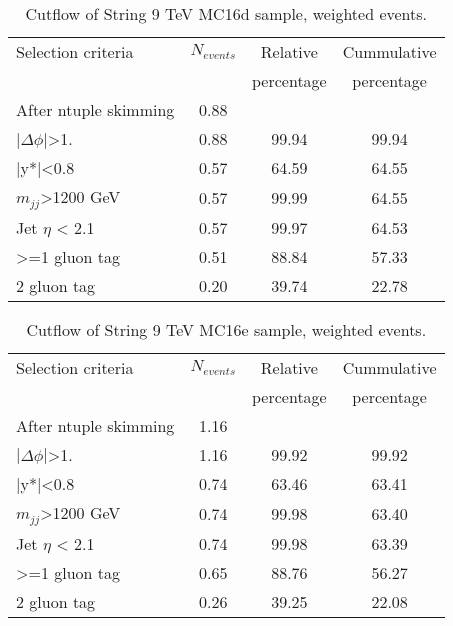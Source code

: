 \begin{table}[ht]
\begin{center}
\begin{tabular}{|l|c|c|c|}
\hline
Selection criteria & $N_{events}$ & Relative & Cummulative \\
 & & percentage & percentage \\
\hline
After ntuple skimming & 0.88 &  &  \\
$|\Delta\phi|$>1. & 0.88 & 99.94 & 99.94 \\
|y*|<0.8 & 0.57 & 64.59 & 64.55 \\
$m_{jj}$>1200 GeV & 0.57 & 99.99 & 64.55 \\
Jet $\eta$ < 2.1 & 0.57 & 99.97 & 64.53 \\
>=1 gluon tag & 0.51 & 88.84 & 57.33 \\
2 gluon tag & 0.20 & 39.74 & 22.78 \\
\hline
\end{tabular}
\end{center}
\caption{Cutflow of String 9 TeV MC16d sample, weighted events.}
\label{tab:String9MC16d}
\end{table}

\begin{table}[ht]
\begin{center}
\begin{tabular}{|l|c|c|c|}
\hline
Selection criteria & $N_{events}$ & Relative & Cummulative \\
 & & percentage & percentage \\
\hline
After ntuple skimming & 1.16 &  &  \\
$|\Delta\phi|$>1. & 1.16 & 99.92 & 99.92 \\
|y*|<0.8 & 0.74 & 63.46 & 63.41 \\
$m_{jj}$>1200 GeV & 0.74 & 99.98 & 63.40 \\
Jet $\eta$ < 2.1 & 0.74 & 99.98 & 63.39 \\
>=1 gluon tag & 0.65 & 88.76 & 56.27 \\
2 gluon tag & 0.26 & 39.25 & 22.08 \\
\hline
\end{tabular}
\end{center}
\caption{Cutflow of String 9 TeV MC16e sample, weighted events.}
\label{tab:String9MC16e}
\end{table}

